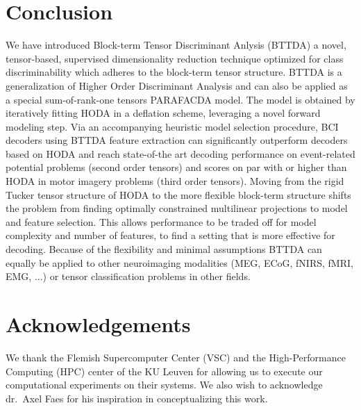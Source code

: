 \section{Conclusion}
We have introduced Block-term Tensor Discriminant Anlysis (BTTDA) a novel,
tensor-based, supervised dimensionality reduction technique optimized for class
discriminability which adheres to the block-term tensor structure.
BTTDA is a generalization of Higher Order Discriminant Analysis and can also be
applied as a special sum-of-rank-one tensors PARAFACDA model.
The model is obtained by iteratively fitting HODA in a deflation scheme,
leveraging a novel forward modeling step.
Via an accompanying heuristic model selection procedure, BCI decoders using BTTDA
feature extraction can significantly outperform decoders based on HODA and
reach state-of-the art decoding performance on event-related potential
problems (second order tensors) and scores on par with or higher than HODA  in motor
imagery problems (third order tensors).
Moving from the rigid Tucker tensor structure of HODA to the more flexible
block-term structure shifts the problem from finding optimally constrained multilinear
projections to model and feature selection.
This allows performance to be traded
off for model complexity and number of features, to find a setting that is more
effective for decoding.
Because of the flexibility and minimal assumptions BTTDA
can equally be applied to other neuroimaging modalities (MEG, ECoG, fNIRS,
fMRI, EMG, ...) or tensor classification problems in other fields.

\section*{Acknowledgements}
We thank the Flemish Supercomputer Center (VSC) and the High-Performance
Computing (HPC) center of the KU Leuven for allowing us to execute our
computational experiments on their systems.
We also wish to acknowledge dr.\ Axel Faes for his inspiration in conceptualizing this
work.

